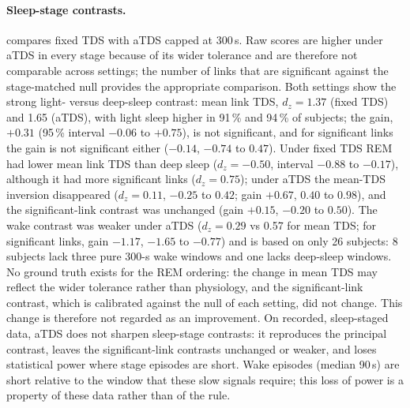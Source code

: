 \documentclass[11pt,a4paper]{article}
\begin{document}
\paragraph{Sleep-stage contrasts.}  compares fixed TDS with aTDS capped at 300\,s. Raw scores are higher under aTDS in every stage because of its wider tolerance and are therefore not comparable across settings; the number of links that are significant against the stage-matched null provides the appropriate comparison. Both settings show the strong light- versus deep-sleep contrast: mean link TDS, $d_z = 1.37$ (fixed TDS) and 1.65 (aTDS), with light sleep higher in 91\,\% and 94\,\% of subjects; the gain, $+0.31$ (95\,\% interval $-0.06$ to $+0.75$), is not significant, and for significant links the gain is not significant either ($-0.14$, $-0.74$ to $0.47$). Under fixed TDS REM had lower mean link TDS than deep sleep ($d_z = -0.50$, interval $-0.88$ to $-0.17$), although it had more significant links ($d_z = 0.75$); under aTDS the mean-TDS inversion disappeared ($d_z = 0.11$, $-0.25$ to $0.42$; gain $+0.67$, $0.40$ to $0.98$), and the significant-link contrast was unchanged (gain $+0.15$, $-0.20$ to $0.50$). The wake contrast was weaker under aTDS ($d_z = 0.29$ vs 0.57 for mean TDS; for significant links, gain $-1.17$, $-1.65$ to $-0.77$) and is based on only 26 subjects: 8 subjects lack three pure 300-s wake windows and one lacks deep-sleep windows. No ground truth exists for the REM ordering: the change in mean TDS may reflect the wider tolerance rather than physiology, and the significant-link contrast, which is calibrated against the null of each setting, did not change. This change is therefore not regarded as an improvement. On recorded, sleep-staged data, aTDS does not sharpen sleep-stage contrasts: it reproduces the principal contrast, leaves the significant-link contrasts unchanged or weaker, and loses statistical power where stage episodes are short. Wake episodes (median 90\,s) are short relative to the window that these slow signals require; this loss of power is a property of these data rather than of the rule.
\end{document}
